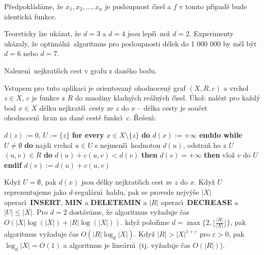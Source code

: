 \flushpar P\v redpokl\'ad\'ame, \v ze $x_1,x_2,\dots,x_n$ je posloupnost 
\v c\'\i sel a $f$ v tomto p\v r\'\i pad\v e bude identick\'a funkce.
\medskip

\flushpar Teoreticky lze uk\'azat, \v ze $d=3$ a $d=4$ jsou lep\v s\'\i\ ne\v z 
$d=2$.  Experimenty uk\'azaly, \v ze optim\'aln\'\i\ algoritmus pro 
posloupnosti d\'elek do 1 000 000 by m\v el b\'yt $d=6$ nebo $d=7$.  
\medskip

\subhead
Nalezen\'\i\ nejkrat\v s\'\i ch cest v grafu z dan\'eho 
bodu.
\endsubhead
\smallskip
 
\flushpar Vstupem pro tuto aplikaci je orientovan\'y ohodnocen\'y graf $(X,R,c)$ a 
vrchol $z\in X$, $c$ je funkce z $R$ do mno\v ziny kladn\'ych 
re\'aln\'ych \v c\'\i sel.\newline 
\'Ukol: nal\'ezt pro ka\v zd\'y bod $x\in X$ d\'elku 
nejkrat\v s\'\i\ cesty ze $z$ do $x$ -- d\'elka cesty je sou\v cet 
ohodnocen\'\i\ hran na dan\'e cest\v e funkc\'\i\ $c$.\newline 
\v Re\v sen\'\i: 
\bigskip

$d(z):=0$, $U:=\{z\}$\newline
{\bf for every} $x\in X\setminus \{z\}$ {\bf do} $d(x):=+\infty$ {\bf enddo\newline
while} $U\ne\emptyset$ {\bf do\newline}
\phantom{---}najdi vrchol $u\in U$ s nejmen\v s\'\i\ hodnotou $d(u)$, odstra\v n ho z $
U$\newline
\phantom{---}{\bf for every} $(u,v)\in R$ {\bf do\newline}
\phantom{------}{\bf if} $d(u)+c(u,v)<d(v)$ {\bf then}\newline 
\phantom{---------}{\bf if} $d(v)=+\infty$ {\bf then} vlo\v z $v$ do $U$ {\bf endif}\newline 
\phantom{---------}$d(v):=d(u)+c(u,v)$\newline 
\phantom{------}{\bf endif}\newline 
\phantom{---}{\bf enddo\newline 
enddo}
\medskip

\flushpar Kdy\v z $U=\emptyset$, pak $d(x)$ jsou d\'elky nejkrat\v s\'\i ch cest ze $
z$ do $x$.
Kdy\v z $U$ reprezentujeme jako $d$-regul\'arn\'\i\ haldu, pak 
se provede nejv\'y\v se $|X|$ operac\'\i\ {\bf INSERT}, {\bf MIN} a {\bf DELETEMIN }
a $|R|$ operac\'\i\ {\bf DECREASE} a $|U|\le |X|$. Pro $d=2$ dost\'av\'ame, 
\v ze algoritmus vy\v zaduje \v cas $O(|X|\log(|X|)+|R|\log(|X|))$. kdy\v z polo\v z\'\i me  
$d=\max\{2,\lfloor\frac {|R|}{|X|}\rfloor \}$, pak algoritmus vy\v zaduje \v cas $
O(|R|\log_d|X|)$.
Kdy\v z $|R|>|X|^{1+\varepsilon}$ pro $\varepsilon >0$, pak $\log_
d|X|=O(1)$ a algoritmus 
je line\'arn\'\i\ (tj. vy\v zaduje \v cas $O(|R|)$).


